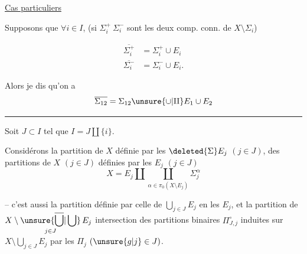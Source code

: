 \uline{Cas particuliers}

Supposons que $\forall i\in I$,   (si $\Sigma_i^+\ \Sigma_i^-$ sont les deux comp. conn. de $X\setminus\Sigma_i$)

\[
\begin{aligned}
\overline{\Sigma_i^+} &= \Sigma_i^+\cup E_i\\
\overline{\Sigma_i^-} &= \Sigma_i^-\cup E_i .
\end{aligned}
\]

Alors je dis qu'on a
\[
\overline{\Sigma_{12}}=\Sigma_{12}\unsure{\cup|\amalg} E_1\cup E_2
\]

\noindent\rule{2.4cm}{0.3pt}\par

\reversemarginpar
{}
\normalmarginpar
{}

Soit $J\subset I$ tel que $I=J\amalg\{i\}$.

Considérons la partition  de $X$  définie par les $\deleted{\Sigma}E_j$ $(j\in J)$,   des partitions  de $X$ $(j\in J)$ définies par les $E_j$  $(j\in J)$
\[
X=E_j\amalg\coprod_{\alpha\in\pi_0(X\setminus E_j)}\Sigma_j^\alpha
\]

-- c'est aussi la partition définie par celle de $\displaystyle\bigcup_{j\in J}E_j$ en les $E_j$, et la partition  de $\displaystyle X\setminus\mathop{\unsure{\overline{\bigcup}|\bigcup}}\limits_{j\in J}E_j$ intersection des partitions binaires $\Pi_{J,j}^{\circ}$  induites sur  $\displaystyle X\setminus\bigcup_{j\in J}E_j$ par les $\Pi_j$ $(\unsure{g|j}\in J)$. 
